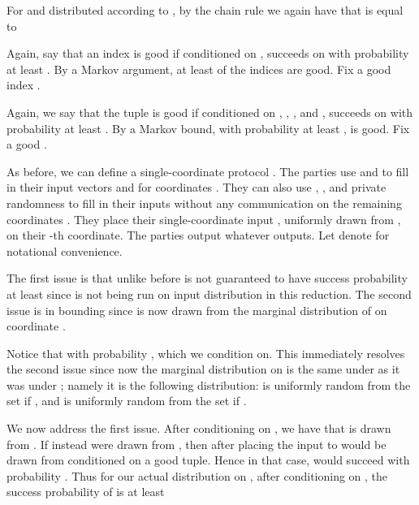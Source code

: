 \documentclass[twoside,leqno,twocolumn]{article}
\begin{document}
For  and  distributed according to , by the chain rule we again have
that  is equal to 

Again, say that an index  is good if conditioned on ,
 succeeds on  with probability at least .
By a Markov argument, at least  of the indices  are good. 
Fix a good index . 

Again, we say that the tuple  is good if conditioned on ,
, ,  and ,  succeeds on 
with probability at least . By a Markov bound, with probability
at least ,  is good. Fix a good .

As before, we can define a single-coordinate protocol . 
The parties use  and  to fill in their input
vectors  and  for coordinates . They can also use 
, , and private randomness to fill in their inputs without any
communication on the remaining coordinates . They place their
single-coordinate input , uniformly drawn from ,
on their -th coordinate. The parties output whatever  outputs. Let 
denote  for notational convenience.

The first issue is that unlike before  is not guaranteed to have success probability
at least  since  is not being run on input distribution 
in this reduction. The second issue is in bounding  since 
 is now drawn from the marginal distribution of  on coordinate . 

\iffalse
Consider a random tuple  formed by choosing  from the marginal
distribution of  and  distributed according to , and independently choosing
 uniformly at random. 
Say that  is {\it good} if  succeeds with probability at
least , conditioned on , and 
 being uniform on . 
For a good , 
it follows that
by placing  on the -th coordinate and outputting whatever  outputs, the
resulting single-coordinate protocol  for distinguishing
 from  under the uniform distribution 
succeeds with probability . 
Hence, for a good tuple , 
 represents the information cost of a protocol 
that succeeds with probability  
on the single-coordinate problem of distinguishing
the inputs  and . By (\ref{eqn:final}), we then have 
. Hence, if we can show that 
, then it
will follow that ,
which will complete the proof. 
It remains to show that . 
\fi

Notice that  with probability , which we condition on. This immediately resolves
the second issue since now the marginal distribution on  is the same under 
as it was under ; namely
it is the following distribution:  is uniformly random from 
the set  if , and  is uniformly
random from the set  if . 

We now address the first issue.  After conditioning on , we
have that  is drawn from .  If
instead  were drawn from , then after
placing  the input to  would be drawn from 
conditioned on a good tuple.  Hence in that case,  would succeed
with probability .  Thus for our actual distribution on
, after conditioning on , the success
probability of  is at least
\end{document}
